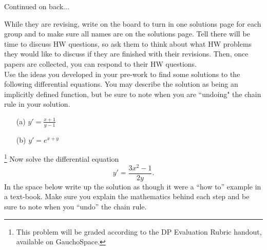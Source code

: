 \documentclass[epsf]{article}
\begin{document}
\noi Continued on back...

\newpage

 While they are revising, write on the board to turn in one solutions page for each group and to make sure all names are on the solutions page.  Tell there will be time to discuss HW questions, so ask them to think about what HW problems they would like to discuss if they are finished with their revisions.  Then, once papers are collected, you can respond to their HW questions.  \\  

  Use the ideas you developed in your pre-work to find some solutions to the following
differential equations. You may describe the solution as being an implicitly defined function, but be sure to note when you are ``undoing" the chain rule in your solution.
\begin{itemize}
\item[(a)] $y'=\frac{x+1}{y-1}$

\item[(b)] $y'=e^{x+y}$\\

\end{itemize}

\footnote{This problem will be graded according to the DP Evaluation Rubric handout, available on GauchoSpace.} Now solve the differential equation
$$ y' = \dfrac{3x^2 - 1}{2y}.$$
In the space below write up the solution as though it were a ``how to'' example in a text-book.  Make sure you explain the mathematics behind each step and be sure to note when you ``undo'' the chain rule.\\
\end{document}
